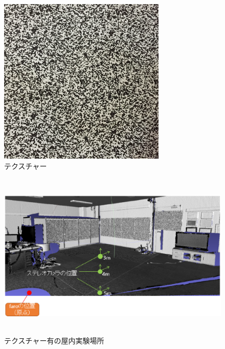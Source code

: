 \vspace{5mm}
\begin{figure}[htbp]
  \begin{center}
   \includegraphics[height=80mm]{figure/テクスチャー.eps}
   \caption{テクスチャー}
   \label{テクスチャー}
  \end{center}
\end{figure}

\begin{figure}[htbp]
  \begin{center}
   \includegraphics[height=80mm]{figure/テクスチャー有の屋内実験場所.eps}
   \caption{テクスチャー有の屋内実験場所}
   \label{テクスチャー有の屋内実験場所}
  \end{center}
\end{figure}

